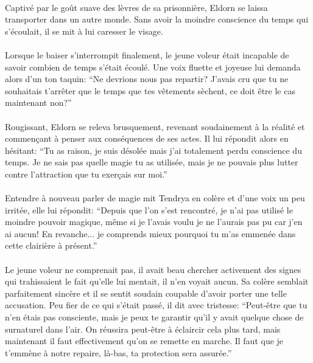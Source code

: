 \paragraph{}
Captivé par le goût suave des lèvres de sa prisonnière, Eldorn se laissa
transporter dans un autre monde. Sans avoir la moindre conscience du temps qui
s'écoulait, il se mit à lui caresser le visage.

\paragraph{}
Lorsque le baiser s'interrompit finalement, le jeune voleur était incapable de
savoir combien de temps s'était écoulé. Une voix fluette et joyeuse lui demanda
alors d'un ton taquin: ``Ne devrions nous pas repartir? J'avais cru que tu ne
souhaitais t'arrêter que le temps que tes vêtements sèchent, ce doit être le cas
maintenant non?''

\paragraph{}
Rougissant, Eldorn se releva brusquement, revenant soudainement à la réalité et
commençant à penser aux conséquences de ses actes. Il lui répondit alors en
hésitant: ``Tu as raison, je suis désolée mais j'ai totalement perdu conscience
du temps. Je ne sais pas quelle magie tu as utilisée, mais je ne pouvais plus
lutter contre l'attraction que tu exerçais sur moi.''

\paragraph{}
Entendre à nouveau parler de magie mit Tendrya en colère et d'une voix un peu
irritée, elle lui répondit: ``Depuis que l'on s'est rencontré, je n'ai pas
utilisé le moindre pouvoir magique, même si je l'avais voulu je ne l'aurais pas
pu car j'en ai aucun! En revanche... je comprends mieux pourquoi tu m'as emmenée
dans cette clairière à présent.''

\paragraph{}
Le jeune voleur ne comprenait pas, il avait beau chercher activement des signes
qui trahissaient le fait qu'elle lui mentait, il n'en voyait aucun. Sa colère
semblait parfaitement sincère et il se sentit soudain coupable d'avoir porter
une telle accusation. Peu fier de ce qui s'était passé, il dit avec tristesse:
``Peut-être que tu n'en étais pas consciente, mais je peux te garantir qu'il y
avait quelque chose de surnaturel dans l'air. On réussira peut-être à éclaircir
cela plus tard, mais maintenant il faut effectivement qu'on se remette en
marche. Il faut que je t'emmène à notre repaire, là-bas, ta protection sera
assurée.''

